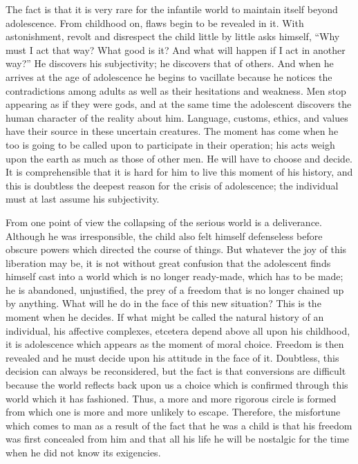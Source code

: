 \documentclass[11pt]{article}
\begin{document}
The fact is that it is very rare for the infantile world to maintain itself beyond adolescence. From childhood on, flaws begin to be revealed in it. With astonishment, revolt and disrespect the child little by little asks himself, “Why must I act that way? What good is it? And what will happen if I act in another way?” He discovers his subjectivity; he discovers that of others. And when he arrives at the age of adolescence he begins to vacillate because he notices the contradictions among adults as well as their hesitations and weakness. Men stop appearing as if they were gods, and at the same time the adolescent discovers the human character of the reality about him. Language, customs, ethics, and values have their source in these uncertain creatures. The moment has come when he too is going to be called upon to participate in their operation; his acts weigh upon the earth as much as those of other men. He will have to choose and decide. It is comprehensible that it is hard for him to live this moment of his history, and this is doubtless the deepest reason for the crisis of adolescence; the individual must at last assume his subjectivity.

From one point of view the collapsing of the serious world is a deliverance. Although he was irresponsible, the child also felt himself defenseless before obscure powers which directed the course of things. But whatever the joy of this liberation may be, it is not without great confusion that the adolescent finds himself cast into a world which is no longer ready-made, which has to be made; he is abandoned, unjustified, the prey of a freedom that is no longer chained up by anything. What will he do in the face of this new situation? This is the moment when he decides. If what might be called the natural history of an individual, his affective complexes, etcetera depend above all upon his childhood, it is adolescence which appears as the moment of moral choice. Freedom is then revealed and he must decide upon his attitude in the face of it. Doubtless, this decision can always be reconsidered, but the fact is that conversions are difficult because the world reflects back upon us a choice which is confirmed through this world which it has fashioned. Thus, a more and more rigorous circle is formed from which one is more and more unlikely to escape. Therefore, the misfortune which comes to man as a result of the fact that he was a child is that his freedom was first concealed from him and that all his life he will be nostalgic for the time when he did not know its exigencies.
\end{document}

